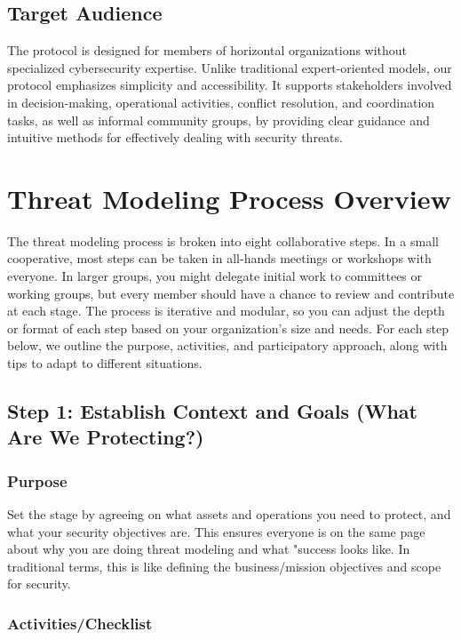 \subsection{Target Audience}
\label{subsec:target_audience}

The protocol is designed for members of horizontal organizations without
specialized cybersecurity expertise. Unlike traditional expert-oriented models,
our protocol emphasizes simplicity and accessibility. It supports stakeholders
involved in decision-making, operational activities, conflict resolution, and
coordination tasks, as well as informal community groups, by providing clear
guidance and intuitive methods for effectively dealing with security threats.

\section{Threat Modeling Process Overview}
\label{sec:threat_modeling_process_overview}

The threat modeling process is broken into eight collaborative steps. In a small
cooperative, most steps can be taken in all-hands meetings or workshops with
everyone. In larger groups, you might delegate initial work to committees or
working groups, but every member should have a chance to review and contribute
at each stage. The process is iterative and modular, so you can adjust the depth
or format of each step based on your organization's size and needs. For each
step below, we outline the purpose, activities, and participatory approach,
along with tips to adapt to different situations.

\subsection{Step 1: Establish Context and Goals (What Are We Protecting?)}
\label{subsec:Step1}

\subsubsection{Purpose}

Set the stage by agreeing on what assets and operations you need to protect, and
what your security objectives are. This ensures everyone is on the same page
about why you are doing threat modeling and what "success looks like. In
traditional terms, this is like defining the business/mission objectives and
scope for security.

\subsubsection{Activities/Checklist}

